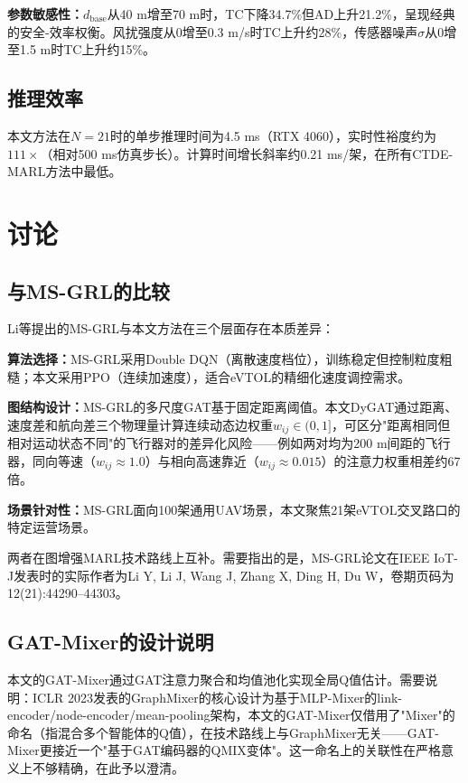 \documentclass[12pt,a4paper,UTF8]{ctexart}
\begin{document}
\textbf{参数敏感性：}$d_{\text{base}}$从40 m增至70 m时，TC下降34.7\%但AD上升21.2\%，呈现经典的安全-效率权衡。风扰强度从0增至0.3 m/s时TC上升约28\%，传感器噪声$\sigma$从0增至1.5 m时TC上升约15\%。

\subsection{推理效率}

本文方法在$N=21$时的单步推理时间为4.5 ms（RTX 4060），实时性裕度约为$111\times$（相对500 ms仿真步长）。计算时间增长斜率约0.21 ms/架，在所有CTDE-MARL方法中最低。

\section{讨论}

\subsection{与MS-GRL的比较}

Li等\cite{ref10}提出的MS-GRL与本文方法在三个层面存在本质差异：

\textbf{算法选择：}MS-GRL采用Double DQN（离散速度档位），训练稳定但控制粒度粗糙；本文采用PPO（连续加速度），适合eVTOL的精细化速度调控需求。

\textbf{图结构设计：}MS-GRL的多尺度GAT基于固定距离阈值。本文DyGAT通过距离、速度差和航向差三个物理量计算连续动态边权重$w_{ij}\in(0,1]$，可区分"距离相同但相对运动状态不同"的飞行器对的差异化风险——例如两对均为200 m间距的飞行器，同向等速（$w_{ij}\approx1.0$）与相向高速靠近（$w_{ij}\approx0.015$）的注意力权重相差约67倍。

\textbf{场景针对性：}MS-GRL面向100架通用UAV场景，本文聚焦21架eVTOL交叉路口的特定运营场景。

两者在图增强MARL技术路线上互补。需要指出的是，MS-GRL论文在IEEE IoT-J发表时的实际作者为Li Y, Li J, Wang J, Zhang X, Ding H, Du W，卷期页码为12(21):44290--44303\cite{ref10}。

\subsection{GAT-Mixer的设计说明}

本文的GAT-Mixer通过GAT注意力聚合和均值池化实现全局Q值估计。需要说明：ICLR 2023发表的GraphMixer\cite{ref28}的核心设计为基于MLP-Mixer的link-encoder/node-encoder/mean-pooling架构，本文的GAT-Mixer仅借用了"Mixer"的命名（指混合多个智能体的Q值），在技术路线上与GraphMixer无关——GAT-Mixer更接近一个"基于GAT编码器的QMIX变体"。这一命名上的关联性在严格意义上不够精确，在此予以澄清。
\end{document}
